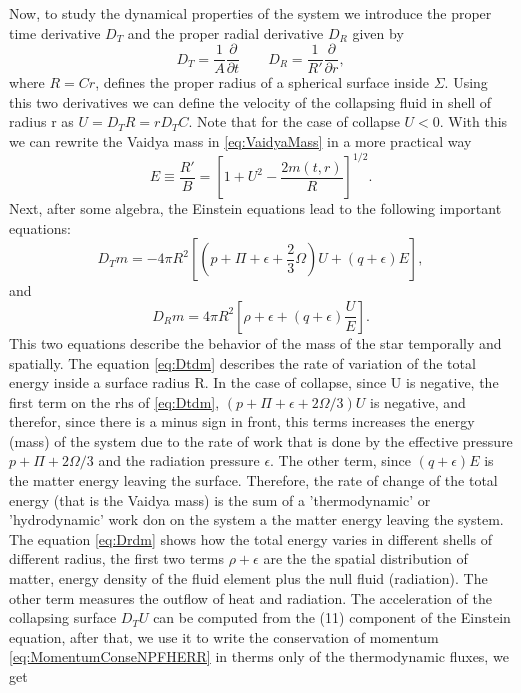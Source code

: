 Now, to study the dynamical properties of the system we introduce the proper time derivative $D_T$ and the proper radial derivative $D_R$ \cite{herrera2009dynamics}\cite{misner1964relativistic} given by
\begin{equation}
	D_T = \frac{1}{A}\frac{\partial}{\partial t} \qquad D_R = \frac{1}{R'} \frac{\partial}{\partial r},
\end{equation}
where $R = Cr$, defines the proper radius of a spherical surface inside $\Sigma$. Using this two derivatives we can define the velocity of the collapsing fluid in shell of radius r as $U = D_T R = rD_T C $. Note that for the case of collapse $U<0$. With this we can rewrite the Vaidya mass in \ref{eq:VaidyaMass} in a more practical way
\begin{equation}
	E \equiv \frac{R'}{B} = \left[1 + U^2 - \frac{2m(t, r)}{R}\right]^{1/2}.
\end{equation}
Next, after some algebra, the Einstein equations lead to the following important equations:
\begin{equation}
\label{eq:Dtdm}
	D_T m = -4\pi R^2\left[\left(p + \Pi + \epsilon + \frac{2}{3}\Omega\right)U + (q+\epsilon)E\right] ,
\end{equation}
and
\begin{equation}
\label{eq:Drdm}
	D_R m = 4\pi R^2 \left[\rho + \epsilon + (q + \epsilon)\frac{U}{E}\right] .
\end{equation}
This two equations describe the behavior of the mass of the star temporally and spatially.  The equation \ref{eq:Dtdm} describes the rate of variation of the total energy inside a surface radius R. In the case of collapse, since U is negative, the first term on the rhs of \ref{eq:Dtdm}, $\left(p + \Pi + \epsilon + 2\Omega/3\right)U$ is negative, and therefor, since there is a minus sign in front, this terms increases the energy (mass) of the system due to the rate of work that is done by the effective pressure $p + \Pi + 2\Omega/3$ and the radiation pressure $\epsilon$. The other term, since $(q+\epsilon)E$ is the matter energy leaving the surface. Therefore, the rate of change of the total energy (that is the Vaidya mass) is the sum of a 'thermodynamic' or 'hydrodynamic' work don on the system a the matter energy leaving the system. The equation \ref{eq:Drdm} shows how the total energy varies in different shells of different radius, the first two terms $\rho + \epsilon$ are the the spatial distribution of matter, energy density of the fluid element plus the null fluid (radiation).  The other term measures the outflow of heat and radiation. The acceleration of the collapsing surface $D_T U$ can be computed from the (11) component of the Einstein equation, after that, we use it to write the conservation of momentum \ref{eq:MomentumConseNPFHERR} in therms only of the thermodynamic fluxes, we get
